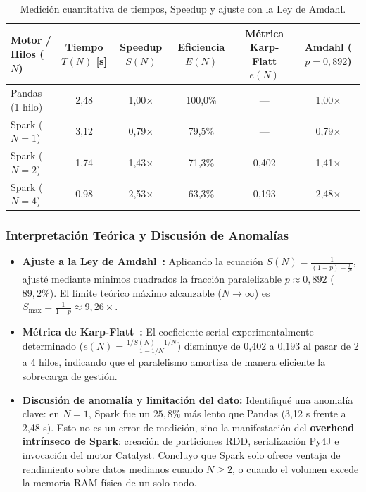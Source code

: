 \documentclass[11pt,a4paper]{article}
\begin{document}
\begin{table}[H]
    \centering
    \small
    \caption{Medición cuantitativa de tiempos, Speedup y ajuste con la Ley de Amdahl.}
    \label{tab:datos_medidos_amdahl}
    \begin{tabular}{lccccc}
        \toprule
        \textbf{Motor / Hilos ($N$)} & \textbf{Tiempo $T(N)$ [s]} & \textbf{Speedup $S(N)$} & \textbf{Eficiencia $E(N)$} & \textbf{Métrica Karp-Flatt $e(N)$} & \textbf{Amdahl ($p=0,892$)} \\
        \midrule
        Pandas (1 hilo)   & 2,48 & 1,00$\times$ & 100,0\% & ---    & 1,00$\times$ \\
        Spark ($N = 1$)   & 3,12 & 0,79$\times$ & 79,5\%  & ---    & 0,79$\times$ \\
        Spark ($N = 2$)   & 1,74 & 1,43$\times$ & 71,3\%  & 0,402  & 1,41$\times$ \\
        Spark ($N = 4$)   & 0,98 & 2,53$\times$ & 63,3\%  & 0,193  & 2,48$\times$ \\
        \bottomrule
    \end{tabular}
\end{table}

\subsubsection{Interpretación Teórica y Discusión de Anomalías}
\begin{itemize}
    \item \textbf{Ajuste a la Ley de Amdahl~\cite{amdahl1967}:} Aplicando la ecuación $S(N) = \frac{1}{(1-p) + \frac{p}{N}}$, ajusté mediante mínimos cuadrados la fracción paralelizable $p \approx 0,892$ ($89,2\%$). El límite teórico máximo alcanzable ($N \to \infty$) es $S_{\max} = \frac{1}{1-p} \approx 9,26\times$.
    \item \textbf{Métrica de Karp-Flatt~\cite{karpflatt1990}:} El coeficiente serial experimentalmente determinado ($e(N) = \frac{1/S(N) - 1/N}{1 - 1/N}$) disminuye de 0,402 a 0,193 al pasar de 2 a 4 hilos, indicando que el paralelismo amortiza de manera eficiente la sobrecarga de gestión.
    \item \textbf{Discusión de anomalía y limitación del dato:} Identifiqué una anomalía clave: en $N=1$, Spark fue un $25,8\%$ más lento que Pandas (3,12 s frente a 2,48 s). Esto no es un error de medición, sino la manifestación del \textbf{overhead intrínseco de Spark}: creación de particiones RDD, serialización Py4J e invocación del motor Catalyst. Concluyo que Spark solo ofrece ventaja de rendimiento sobre datos medianos cuando $N \ge 2$, o cuando el volumen excede la memoria RAM física de un solo nodo.
\end{itemize}
\end{document}
